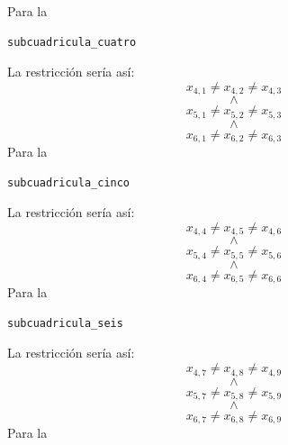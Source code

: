 \documentclass[12pt]{article}
\begin{document}
\begin{itemize}
\begin{itemize}
Para la
\begin{verbatim}
subcuadricula_cuatro
\end{verbatim}
La restricción sería así:
\begin{equation*}
x_{4,1} \neq x_{4,2} \neq x_{4,3}
\end{equation*}
\begin{equation*}
\land
\end{equation*}
\begin{equation*}
x_{5,1} \neq x_{5,2} \neq x_{5,3}
\end{equation*}
\begin{equation*}
\land
\end{equation*}
\begin{equation*}
x_{6,1} \neq x_{6,2} \neq x_{6,3}
\end{equation*}
Para la
\begin{verbatim}
subcuadricula_cinco
\end{verbatim}
La restricción sería así:
\begin{equation*}
x_{4,4} \neq x_{4,5} \neq x_{4,6}
\end{equation*}
\begin{equation*}
\land
\end{equation*}
\begin{equation*}
x_{5,4} \neq x_{5,5} \neq x_{5,6}
\end{equation*}
\begin{equation*}
\land
\end{equation*}
\begin{equation*}
x_{6,4} \neq x_{6,5} \neq x_{6,6}
\end{equation*}
Para la
\begin{verbatim}
subcuadricula_seis
\end{verbatim}
La restricción sería así:
\begin{equation*}
x_{4,7} \neq x_{4,8} \neq x_{4,9}
\end{equation*}
\begin{equation*}
\land
\end{equation*}
\begin{equation*}
x_{5,7} \neq x_{5,8} \neq x_{5,9}
\end{equation*}
\begin{equation*}
\land
\end{equation*}
\begin{equation*}
x_{6,7} \neq x_{6,8} \neq x_{6,9}
\end{equation*}
Para la
\begin{verbatim}

\end{verbatim}
\end{itemize}
\end{itemize}
\end{document}
